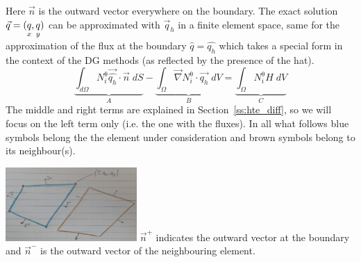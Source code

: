 Here $\vec{n}$ is the outward vector everywhere on the boundary. 
The exact solution $\vec{q}=(\underset{\tiny x}{q},\underset{\tiny y}{q})$ can be approximated with $\vec{q}_h$ in a  finite element space, same for the approximation of the flux at the boundary $\hat{q}=\hat{q_h}$ which takes a special form in the context of the DG methods (as reflected by the presence of the hat).
\begin{equation}
\underbrace{ \int_{d\Omega}{N^\uptheta_i} \vec{\hat{q_h}} \cdot \vec{n} \; dS}_{A } - 
\underbrace{ \int_{\Omega} \vec{\nabla} {N^\uptheta_i} \cdot \vec{q_h} \; dV}_{B} = 
\underbrace{\int_{\Omega} {N^\uptheta_i} H  \;dV }_C
\label{eq:q2dss}
\end{equation}
The middle and right terms are explained in Section~\ref{ss:hte_diff}, 
so we will focus on the left term only (i.e. the one with the fluxes).
In all what follows blue symbols belong the the element under consideration 
and brown symbols belong to its neighbour(s).

\includegraphics[width=5cm,angle=90]{images/dgfem/elts}
$\vec{n}^+$ indicates the outward vector at the boundary and $\vec{n}^-$ is 
the outward vector of the neighbouring element.

